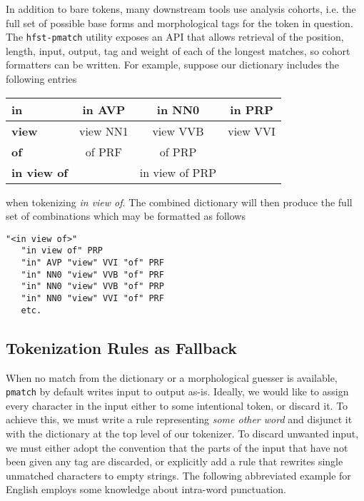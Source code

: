 \documentclass{llncs}
\begin{document}
In addition to bare tokens, many downstream tools use analysis cohorts, i.e.\@
the full set of possible base forms and morphological tags for the token in
question. The \verb+hfst-pmatch+ utility exposes an API that allows retrieval of the
position, length, input, output, tag and weight of each of the longest matches, 
so cohort formatters can be written. 
For example, suppose our dictionary includes the
following entries

\begin{table}[H]
\begin{center}
\begin{tabular}{| l | c  c  c |}
  \hline
  \textbf{in} & in AVP & in NN0 & in PRP \\
  \hline
  \textbf{view} & view NN1 & view VVB & view VVI \\
  \hline
  \textbf{of} & of PRF & of PRP & \\
  \hline
  \textbf{in view of} & & in view of PRP & \\
  \hline
\end{tabular}
\end{center}
\end{table}

\noindent when tokenizing \emph{in view of}. The combined dictionary will then produce the full
set of combinations which may be formatted as follows

\begin{center}
\begin{framed}
\begin{verbatim}
"<in view of>"
   "in view of" PRP
   "in" AVP "view" VVI "of" PRF
   "in" NN0 "view" VVB "of" PRF
   "in" NN0 "view" VVB "of" PRP
   "in" NN0 "view" VVI "of" PRF
   etc.
\end{verbatim}
\end{framed}
\end{center}

\subsection{Tokenization Rules as Fallback}

When no match from the dictionary or a morphological guesser is available,
\verb+pmatch+ by default
writes input to output as-is. Ideally, we would like to assign every character
in the input either to some intentional token, or discard it. 
To achieve this, we must write a rule representing
\emph{some other word} and disjunct it with the dictionary at the top level of
our tokenizer. To discard unwanted input, we must either adopt the convention
that the parts of the input that have not been
given any tag are discarded, or explicitly add a rule that rewrites single
unmatched characters to empty strings. The following abbreviated example for English
employs some knowledge about intra-word punctuation.
\end{document}
